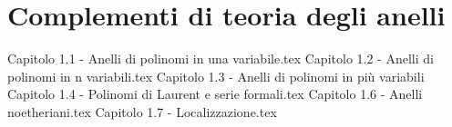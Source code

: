 \documentclass{article}
\begin{document}
\setcounter{page}{1}
\section{Complementi di teoria degli anelli}
{Capitolo 1.1 - Anelli di polinomi in una variabile.tex}
{Capitolo 1.2 - Anelli di polinomi in n variabili.tex}
{Capitolo 1.3 - Anelli di polinomi in più variabili}
{Capitolo 1.4 - Polinomi di Laurent e serie formali.tex}
{Capitolo 1.6 - Anelli noetheriani.tex}
{Capitolo 1.7 - Localizzazione.tex}
\end{document}
